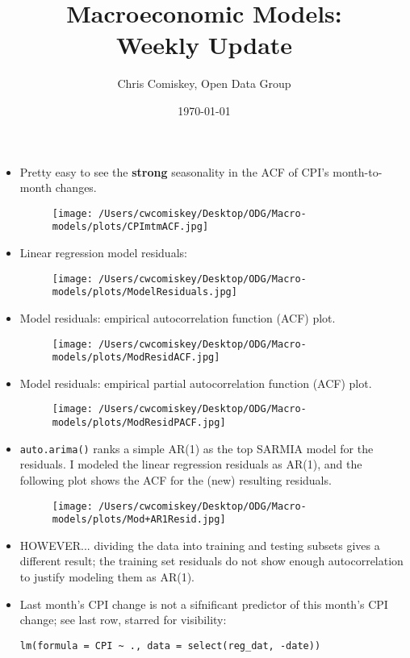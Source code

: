 \documentclass{article}
\title{Macroeconomic Models: \\ Weekly Update}
\author{Chris Comiskey, Open Data Group}
\date{\today}
\begin{document}
\maketitle{}

\begin{itemize}
\item Pretty easy to see the {\bf strong} seasonality in the ACF of CPI's month-to-month changes.
  \begin{figure}[H]
  \centering
  \texttt{[image: /Users/cwcomiskey/Desktop/ODG/Macro-models/plots/CPImtmACF.jpg]}
  \end{figure}
\item Linear regression model residuals:
      \begin{figure}[H]
      \centering
      \texttt{[image: /Users/cwcomiskey/Desktop/ODG/Macro-models/plots/ModelResiduals.jpg]}
      \end{figure}
\item Model residuals: empirical autocorrelation function (ACF) plot.
      \begin{figure}[H]
      \centering
      \texttt{[image: /Users/cwcomiskey/Desktop/ODG/Macro-models/plots/ModResidACF.jpg]}
      \end{figure}
\item Model residuals: empirical partial autocorrelation function (ACF) plot.
      \begin{figure}[H]
      \centering
      \texttt{[image: /Users/cwcomiskey/Desktop/ODG/Macro-models/plots/ModResidPACF.jpg]}
      \end{figure}
\item \verb|auto.arima()| ranks a simple AR(1) as the top SARMIA model for the residuals. I modeled the linear regression residuals as AR(1), and the following plot shows the ACF for the (new) resulting residuals.
      \begin{figure}[H]
      \centering
      \texttt{[image: /Users/cwcomiskey/Desktop/ODG/Macro-models/plots/Mod+AR1Resid.jpg]}
      \end{figure}
\item HOWEVER... dividing the data into training and testing subsets gives a different result; the training set residuals do not show enough autocorrelation to justify modeling them as AR(1).
\item Last month's CPI change is not a sifnificant predictor of this month's CPI change; see last row, starred for visibility:
\begin{verbatim}
lm(formula = CPI ~ ., data = select(reg_dat, -date))


\end{verbatim}
\end{itemize}
\end{document}

